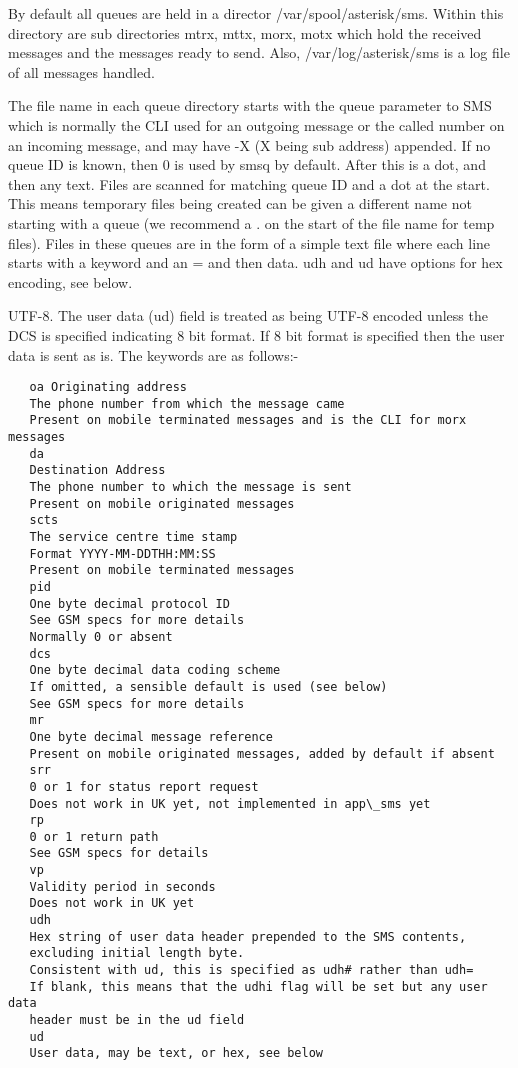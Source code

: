    By default all queues are held in a director /var/spool/asterisk/sms.
   Within this directory are sub directories mtrx, mttx, morx, motx which
   hold the received messages and the messages ready to send. Also,
   /var/log/asterisk/sms is a log file of all messages handled.
   
   The file name in each queue directory starts with the queue parameter
   to SMS which is normally the CLI used for an outgoing message or the
   called number on an incoming message, and may have -X (X being sub
   address) appended. If no queue ID is known, then 0 is used by smsq by
   default. After this is a dot, and then any text. Files are scanned for
   matching queue ID and a dot at the start. This means temporary files
   being created can be given a different name not starting with a queue
   (we recommend a . on the start of the file name for temp files).
   Files in these queues are in the form of a simple text file where each
   line starts with a keyword and an = and then data. udh and ud have
   options for hex encoding, see below.

   UTF-8. The user data (ud) field is treated as being UTF-8 encoded
   unless the DCS is specified indicating 8 bit format. If 8 bit format
   is specified then the user data is sent as is.
   The keywords are as follows:-
\begin{verbatim}
   oa Originating address
   The phone number from which the message came
   Present on mobile terminated messages and is the CLI for morx messages
   da
   Destination Address
   The phone number to which the message is sent
   Present on mobile originated messages
   scts
   The service centre time stamp
   Format YYYY-MM-DDTHH:MM:SS
   Present on mobile terminated messages
   pid
   One byte decimal protocol ID
   See GSM specs for more details
   Normally 0 or absent
   dcs
   One byte decimal data coding scheme
   If omitted, a sensible default is used (see below)
   See GSM specs for more details
   mr
   One byte decimal message reference
   Present on mobile originated messages, added by default if absent
   srr
   0 or 1 for status report request
   Does not work in UK yet, not implemented in app\_sms yet
   rp
   0 or 1 return path
   See GSM specs for details
   vp
   Validity period in seconds
   Does not work in UK yet
   udh
   Hex string of user data header prepended to the SMS contents,
   excluding initial length byte.
   Consistent with ud, this is specified as udh# rather than udh=
   If blank, this means that the udhi flag will be set but any user data
   header must be in the ud field
   ud
   User data, may be text, or hex, see below
\end{verbatim}

